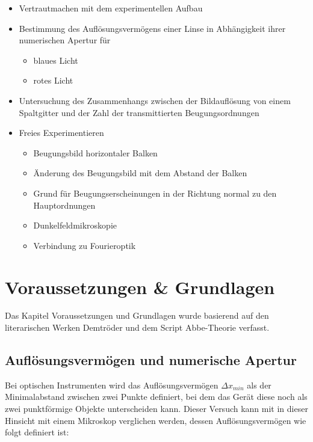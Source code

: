 \documentclass[12pt,a4paper,twoside]{article}
\begin{document}
\begin{itemize}
    \item Vertrautmachen mit dem experimentellen Aufbau
    \item Bestimmung des Auflösungsvermögens einer Linse in Abhängigkeit ihrer numerischen Apertur für
    \begin{itemize}
        \item blaues Licht
        \item rotes Licht
    \end{itemize}
    \item Untersuchung des Zusammenhangs zwischen der Bildauflösung von einem Spaltgitter und der Zahl der transmittierten Beugungsordnungen
    \item  Freies Experimentieren
    \begin{itemize}
        \item Beugungsbild horizontaler Balken
        \item Änderung des Beugungsbild mit dem Abstand der Balken
        \item Grund für Beugungserscheinungen in der Richtung normal zu den Hauptordnungen
        \item Dunkelfeldmikroskopie
        \item Verbindung zu Fourieroptik
    \end{itemize}
\end{itemize}



\section{Voraussetzungen \& Grundlagen} %

Das Kapitel Voraussetzungen und Grundlagen wurde basierend auf den literarischen Werken Demtröder \cite{dem2} und dem Script Abbe-Theorie \cite{teachcenter2} verfasst.

\subsection{Auflösungsvermögen und numerische Apertur}

Bei optischen Instrumenten wird das Auflösungsvermögen $\Delta x_{min}$ als der Minimalabstand zwischen zwei Punkte definiert, bei dem das Gerät diese noch als zwei punktförmige Objekte unterscheiden kann.
Dieser Versuch kann mit in dieser Hinsicht mit einem Mikroskop verglichen werden, dessen Auflösungsvermögen wie folgt definiert ist:
\end{document}
